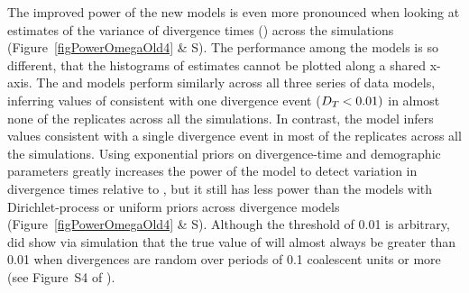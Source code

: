 The improved power of the new models is even more pronounced when looking at
estimates of the variance of divergence times (\divTimeDispersion) across the
simulations
(Figure~\ref{figPowerOmegaOld4} \& 
S).
The performance among the models is so different, that the histograms of
\divTimeDispersion estimates cannot be plotted along a shared x-axis.
The \modelDPP and \modelUniform models perform similarly across all three
series of data models, inferring values of \divTimeDispersion consistent with
one divergence event ($D_{T_{}} < 0.01)$ in almost none of the
replicates across all the simulations.
In contrast, the \modelOld model infers values consistent with a single
divergence event in most of the replicates across all the simulations.
Using exponential priors on divergence-time and demographic parameters greatly
increases the power of the \modelUshaped model to detect variation in
divergence times relative to \modelOld, but it still has less power than the
models with Dirichlet-process or uniform priors across divergence models 
(Figure~\ref{figPowerOmegaOld4} \& 
S).
Although the \divTimeDispersion threshold of 0.01 is arbitrary, \cite{Oaks2012}
did show via simulation that the true value of \divTimeDispersion will almost
always be greater than 0.01 when divergences are random over periods of 0.1
coalescent units or more (see Figure~S4 of \cite{Oaks2012}).

